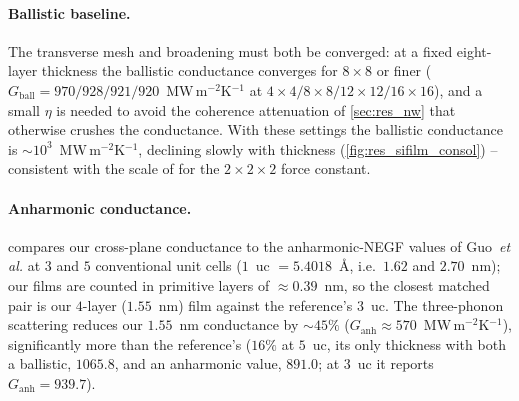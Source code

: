 \paragraph{Ballistic baseline.} The transverse mesh and broadening must
both be converged: at a fixed eight-layer thickness the ballistic
conductance converges for $8\times8$ or finer
($G_\mathrm{ball}=970/928/921/920$~MW\,m$^{-2}$K$^{-1}$ at
$4\times4/8\times8/12\times12/16\times16$), and a small $\eta$ is needed to
avoid the coherence attenuation of \cref{sec:res_nw} that otherwise
crushes the conductance. With these settings the ballistic conductance is
$\sim10^{3}$~MW\,m$^{-2}$K$^{-1}$, declining slowly with thickness
(\cref{fig:res_sifilm_consol}) -- consistent with the scale of
\citet{guo_quantum_2020} for the $2\times2\times2$ force constant.

\paragraph{Anharmonic conductance.} 
compares our cross-plane conductance to the anharmonic-NEGF values of
Guo~\emph{et al.} at $3$ and $5$ conventional unit cells ($1$~uc
$=5.4018$~\AA, i.e.\ $1.62$ and $2.70$~nm); our films are counted in
primitive layers of $\approx0.39$~nm, so the closest matched pair is our
$4$-layer ($1.55$~nm) film against the reference's $3$~uc. The three-phonon
scattering reduces our $1.55$~nm conductance by $\sim45\%$
($G_\mathrm{anh}\approx570$~MW\,m$^{-2}$K$^{-1}$), significantly more than the
reference's ($16\%$ at $5$~uc, its only thickness with both a ballistic,
$1065.8$, and an anharmonic value, $891.0$; at $3$~uc it reports
$G_\mathrm{anh}=939.7$).
